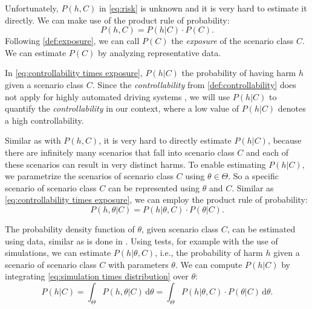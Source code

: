 \documentclass[10pt,final,a4paper,oneside,onecolumn]{article}
\newcommand*{\ud}{\mathrm{\,d}}                                 %
\theoremstyle{plain}\newtheorem{definition}{Definition}[section]    %
\theoremstyle{definition}\newtheorem{example}{Example}[section]     %
\theoremstyle{remark}\newtheorem{remarkenv}{Remark}[section]        %
\newcommand{\harm}{h}
\newcommand{\parameter}{\theta}
\newcommand{\parameterspace}{\Theta}
\newcommand{\prob}[1]{P\left(#1\right)}
\newcommand{\scenarioclass}{C}
\begin{document}
Unfortunately, $\prob{\harm,\scenarioclass}$ in \cref{eq:risk} is unknown and it is very hard to estimate it directly. We can make use of the product rule of probability:
\begin{equation} \label{eq:controllability times exposure}
	\prob{\harm,\scenarioclass} = \prob{\harm|\scenarioclass} \cdot \prob{\scenarioclass}.
\end{equation}
Following \cref{def:exposure}, we can call $\prob{\scenarioclass}$ the \emph{exposure} of the scenario class $\scenarioclass$. We can estimate $\prob{\scenarioclass}$ by analyzing representative data. 

In \cref{eq:controllability times exposure}, $\prob{\harm|\scenarioclass}$ the probability of having harm $h$ given a scenario class $C$. Since the \emph{controllability} from \cref{def:controllability} does not apply for highly automated driving systems \cite{monkhouse2015notion, khastgir2017towards}, we will use $\prob{\harm|\scenarioclass}$ to quantify the \emph{controllability} in our context, where a low value of $\prob{\harm|\scenarioclass}$ denotes a high controllability.

Similar as with $\prob{\harm,\scenarioclass}$, it is very hard to directly estimate $\prob{\harm|\scenarioclass}$, because there are infinitely many scenarios that fall into scenario class $C$ and each of these scenarios can result in very distinct harms. To enable estimating $\prob{\harm|\scenarioclass}$, we parametrize the scenarios of scenario class $C$ using $\parameter\in\parameterspace$. So a specific scenario of scenario class $C$ can be represented using $\theta$ and $C$. Similar as \cref{eq:controllability times exposure}, we can employ the product rule of probability:
\begin{equation} \label{eq:simulation times distribution}
	\prob{\harm,\parameter|\scenarioclass} = \prob{\harm|\parameter,\scenarioclass} \cdot \prob{\parameter|\scenarioclass}.
\end{equation}

The probability density function of $\parameter$, given scenario class $\scenarioclass$, can be estimated using data, similar as is done in \cite{deGelder2017assessment}. Using tests, for example with the use of simulations, we can estimate $\prob{\harm|\parameter,\scenarioclass}$, i.e., the probability of harm $h$ given a scenario of scenario class $C$ with parameters $\parameter$. We can compute $\prob{\harm|\scenarioclass}$ by integrating \cref{eq:simulation times distribution} over $\parameter$:
\begin{equation} \label{eq:controllability}
	\prob{\harm|\scenarioclass} 
	= \int_{\parameterspace} P(\harm,\parameter|\scenarioclass) \ud \parameter
	= \int_{\parameterspace} \prob{\harm|\parameter,\scenarioclass} \cdot \prob{\parameter|\scenarioclass} \ud \parameter.
\end{equation}



\printbibliography
\end{document}
